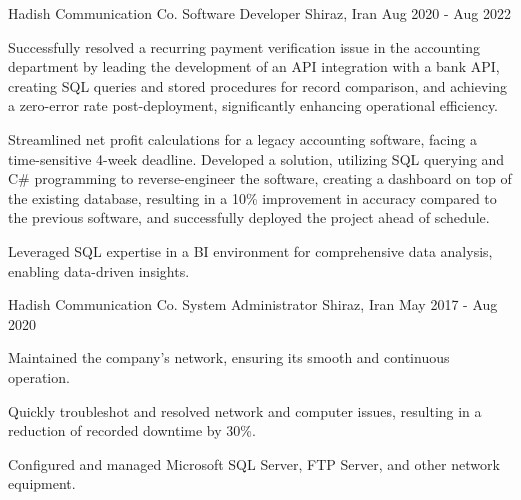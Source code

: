 

\begin{cventries}

    \cventry
    {Hadish Communication Co.} %
    {Software Developer} %
    {Shiraz, Iran} %
    {Aug 2020 - Aug 2022} %
    {
      \begin{cvitems} %
        \item {Successfully resolved a recurring payment verification issue in the accounting department by leading the development of an API integration with a bank API, creating SQL queries and stored procedures for record comparison, and achieving a zero-error rate post-deployment, significantly enhancing operational efficiency.}
        \item {Streamlined net profit calculations for a legacy accounting software, facing a time-sensitive 4-week deadline. Developed a solution, utilizing SQL querying and C\# programming to reverse-engineer the software, creating a dashboard on top of the existing database, resulting in a 10\% improvement in accuracy compared to the previous software, and successfully deployed the project ahead of schedule.}
        \item {Leveraged SQL expertise in a BI environment for comprehensive data analysis, enabling data-driven insights.}
      \end{cvitems}
    }%
    \cventry
    {Hadish Communication Co.} %
    {System Administrator} %
    {Shiraz, Iran} %
    {May 2017 - Aug 2020} %
    {
      \begin{cvitems} %
        \item {Maintained the company's network, ensuring its smooth and continuous operation.}
        \item {Quickly troubleshot and resolved network and computer issues, resulting in a reduction of recorded downtime by 30\%.}
        \item {Configured and managed Microsoft SQL Server, FTP Server, and other network equipment.}

\end{cvitems}}
\end{cventries}
